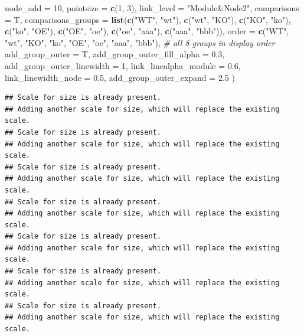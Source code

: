 \documentclass[
]{book}
\newenvironment{Shaded}{\begin{snugshade}}{\end{snugshade}}
\newcommand{\AttributeTok}[1]{\textcolor[rgb]{0.13,0.29,0.53}{#1}}
\newcommand{\CommentTok}[1]{\textcolor[rgb]{0.56,0.35,0.01}{\textit{#1}}}
\newcommand{\DecValTok}[1]{\textcolor[rgb]{0.00,0.00,0.81}{#1}}
\newcommand{\FloatTok}[1]{\textcolor[rgb]{0.00,0.00,0.81}{#1}}
\newcommand{\FunctionTok}[1]{\textcolor[rgb]{0.13,0.29,0.53}{\textbf{#1}}}
\newcommand{\NormalTok}[1]{#1}
\newcommand{\StringTok}[1]{\textcolor[rgb]{0.31,0.60,0.02}{#1}}
\begin{document}
\begin{Shaded}
\begin{Highlighting}[]
  \AttributeTok{node\_add                     =} \DecValTok{10}\NormalTok{,}
  \AttributeTok{pointsize                    =} \FunctionTok{c}\NormalTok{(}\DecValTok{1}\NormalTok{, }\DecValTok{3}\NormalTok{),}
  \AttributeTok{link\_level                   =} \StringTok{"Module\&Node2"}\NormalTok{,}
  \AttributeTok{comparisons                  =}\NormalTok{ T,}
  \AttributeTok{comparisons\_groups           =} \FunctionTok{list}\NormalTok{(}\FunctionTok{c}\NormalTok{(}\StringTok{"WT"}\NormalTok{, }\StringTok{"wt"}\NormalTok{),}
                                      \FunctionTok{c}\NormalTok{(}\StringTok{"wt"}\NormalTok{, }\StringTok{"KO"}\NormalTok{),}
                                      \FunctionTok{c}\NormalTok{(}\StringTok{"KO"}\NormalTok{, }\StringTok{"ko"}\NormalTok{),}
                                      \FunctionTok{c}\NormalTok{(}\StringTok{"ko"}\NormalTok{, }\StringTok{"OE"}\NormalTok{),}
                                      \FunctionTok{c}\NormalTok{(}\StringTok{"OE"}\NormalTok{, }\StringTok{"oe"}\NormalTok{),}
                                      \FunctionTok{c}\NormalTok{(}\StringTok{"oe"}\NormalTok{, }\StringTok{"aaa"}\NormalTok{),}
                                      \FunctionTok{c}\NormalTok{(}\StringTok{"aaa"}\NormalTok{, }\StringTok{"bbb"}\NormalTok{)),}
  \AttributeTok{order                        =} \FunctionTok{c}\NormalTok{(}\StringTok{"WT"}\NormalTok{, }\StringTok{"wt"}\NormalTok{, }\StringTok{"KO"}\NormalTok{, }\StringTok{"ko"}\NormalTok{, }\StringTok{"OE"}\NormalTok{, }\StringTok{"oe"}\NormalTok{, }\StringTok{"aaa"}\NormalTok{, }\StringTok{"bbb"}\NormalTok{), }\CommentTok{\# all 8 groups in display order}
  \AttributeTok{add\_group\_outer              =}\NormalTok{ T,}
  \AttributeTok{add\_group\_outer\_fill\_alpha   =} \FloatTok{0.3}\NormalTok{,}
  \AttributeTok{add\_group\_outer\_linewidth    =} \DecValTok{1}\NormalTok{,}
  \AttributeTok{link\_linealpha\_module        =} \FloatTok{0.6}\NormalTok{,}
  \AttributeTok{link\_linewidth\_node          =} \FloatTok{0.5}\NormalTok{,}
  \AttributeTok{add\_group\_outer\_expand       =} \FloatTok{2.5}
\NormalTok{)}
\end{Highlighting}
\end{Shaded}

\begin{verbatim}
## Scale for size is already present.
## Adding another scale for size, which will replace the existing scale.
## Scale for size is already present.
## Adding another scale for size, which will replace the existing scale.
## Scale for size is already present.
## Adding another scale for size, which will replace the existing scale.
## Scale for size is already present.
## Adding another scale for size, which will replace the existing scale.
## Scale for size is already present.
## Adding another scale for size, which will replace the existing scale.
## Scale for size is already present.
## Adding another scale for size, which will replace the existing scale.
## Scale for size is already present.
## Adding another scale for size, which will replace the existing scale.
\end{verbatim}
\end{document}
